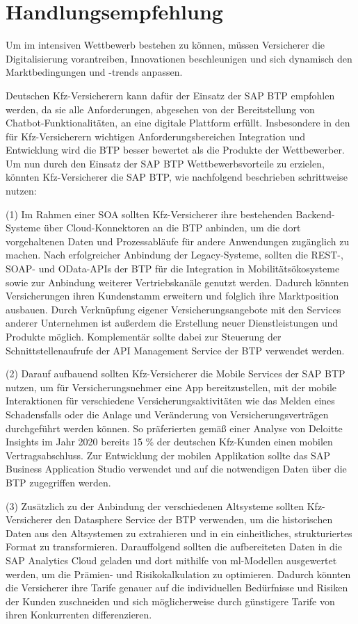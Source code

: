 \chapter{Handlungsempfehlung}

Um im intensiven Wettbewerb bestehen zu können, müssen Versicherer die Digitalisierung  vorantreiben, Innovationen beschleunigen und sich dynamisch den Marktbedingungen und -trends anpassen.

Deutschen Kfz-Versicherern kann dafür der Einsatz der SAP BTP empfohlen werden, da sie alle Anforderungen, abgesehen von der Bereitstellung von Chatbot-Funktionalitäten, an eine digitale Plattform erfüllt. Insbesondere in den für Kfz-Versicherern wichtigen Anforderungsbereichen Integration und Entwicklung wird die BTP besser bewertet als die Produkte der Wettbewerber. Um nun durch den Einsatz der SAP BTP Wettbewerbsvorteile zu erzielen, könnten Kfz-Versicherer die SAP BTP, wie nachfolgend beschrieben schrittweise nutzen:

(1) Im Rahmen einer SOA sollten Kfz-Versicherer ihre bestehenden Backend-Systeme über Cloud-Konnektoren an die BTP anbinden, um die dort vorgehaltenen Daten und Prozessabläufe für andere Anwendungen zugänglich zu machen. Nach erfolgreicher Anbindung der Legacy-Systeme, sollten die REST-, SOAP- und OData-APIs der BTP für die Integration in Mobilitätsökosysteme sowie zur Anbindung weiterer Vertriebskanäle genutzt werden. Dadurch könnten Versicherungen ihren Kundenstamm erweitern und folglich ihre Marktposition ausbauen. Durch Verknüpfung eigener Versicherungsangebote mit den Services anderer Unternehmen ist außerdem die Erstellung neuer Dienstleistungen und Produkte möglich. Komplementär sollte dabei zur Steuerung der Schnittstellenaufrufe der API Management Service der BTP verwendet werden.

(2) Darauf aufbauend sollten Kfz-Versicherer die Mobile Services der SAP BTP nutzen, um für Versicherungsnehmer eine App bereitzustellen, mit der mobile Interaktionen für verschiedene Versicherungsaktivitäten wie das Melden eines Schadensfalls oder die Anlage und Veränderung von Versicherungsverträgen durchgeführt werden können. So präferierten gemäß einer Analyse von Deloitte Insights im Jahr 2020 bereits 15 \% der deutschen Kfz-Kunden einen mobilen Vertragsabschluss.\autocite[Vgl.][S. 15]{BAUMANN2020} Zur Entwicklung der mobilen Applikation sollte das SAP Business Application Studio verwendet und auf die notwendigen Daten über die BTP zugegriffen werden. 

(3) Zusätzlich zu der Anbindung der verschiedenen Altsysteme sollten Kfz- Versicherer den Datasphere Service der BTP verwenden, um die historischen Daten aus den Altsystemen zu extrahieren und in ein einheitliches, strukturiertes Format zu transformieren. Darauffolgend sollten die aufbereiteten Daten in die SAP Analytics Cloud geladen und dort mithilfe von \ac{ml}-Modellen ausgewertet werden, um die Prämien- und Risikokalkulation zu optimieren. Dadurch könnten die Versicherer ihre Tarife genauer auf die individuellen Bedürfnisse und Risiken der Kunden zuschneiden und sich möglicherweise durch günstigere Tarife von ihren Konkurrenten differenzieren.

